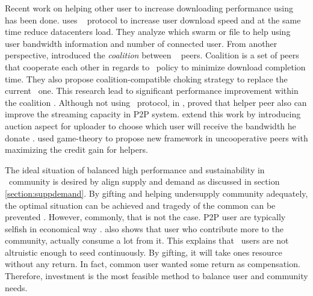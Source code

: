 Recent work on helping other user to increase downloading performance using \bt~ has been done. \citeauthor{2014:cloudseed:leon} uses \bt~ protocol to increase user download speed and at the same time reduce datacenters load. They analyze which swarm or file to help using user bandwidth information and number of connected user\cite{2014:cloudseed:leon}. From another perspective, \citeauthor{2015:coalitionbt:zhang} introduced the \textit{coalition} between \bt~ peers. Coalition is a set of peers that cooperate each other in regards to \bt~policy to minimize download completion time. They also propose coalition-compatible choking strategy to replace the current \bt~one. This research lead to significant performance improvement within the coalition \cite{2015:coalitionbt:zhang}. Although not using \bt~protocol, in \citeyear{2009:p2phelp:he}, \citeauthor{2009:p2phelp:he} proved that helper peer also can improve the streaming capacity in P2P system\cite{2009:p2phelp:he}. \citeauthor{2016:gameauctionp2pstream:mostafavi} extend this work by introducing auction aspect for uploader to choose which user will receive the bandwidth he donate \cite{2016:gameauctionp2pstream:mostafavi}. \citeauthor{2016:gameauctionp2pstream:mostafavi} used game-theory to propose new framework in uncooperative peers with maximizing the credit gain for helpers.

The ideal situation of balanced high performance and sustainability in \bt~community is desired by align supply and demand as discussed in section \ref{section:suppdemand}. By gifting and helping undersupply community adequately, the optimal situation can be achieved and tragedy of the common can be prevented \cite{2002:reputationtotragedy:milinski}. However, commonly, that is not the case. P2P user are typically selfish in economical way \cite{2014:userbehaviourprivate:jia}. \citeauthor{2009:demandsupplyres:andrade} also shows that user who contribute more to the community, actually consume a lot from it. This explains that \bt~users are not altruistic enough to seed continuously. By gifting, it will take ones resource without any return. In fact, common user wanted some return as compensation. Therefore, investment is the most feasible method to balance user and community needs.

